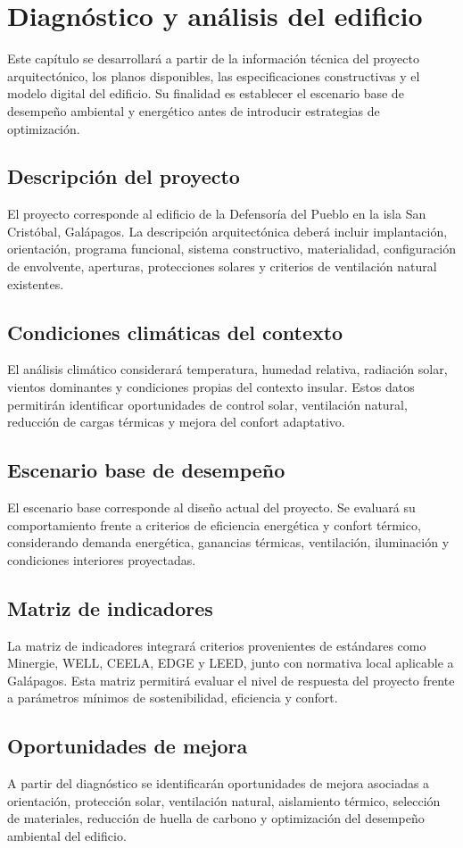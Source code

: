 \chapter{Diagnóstico y análisis del edificio}

Este capítulo se desarrollará a partir de la información técnica del proyecto arquitectónico, los planos disponibles, las especificaciones constructivas y el modelo digital del edificio. Su finalidad es establecer el escenario base de desempeño ambiental y energético antes de introducir estrategias de optimización.

\section{Descripción del proyecto}

El proyecto corresponde al edificio de la Defensoría del Pueblo en la isla San Cristóbal, Galápagos. La descripción arquitectónica deberá incluir implantación, orientación, programa funcional, sistema constructivo, materialidad, configuración de envolvente, aperturas, protecciones solares y criterios de ventilación natural existentes.

\section{Condiciones climáticas del contexto}

El análisis climático considerará temperatura, humedad relativa, radiación solar, vientos dominantes y condiciones propias del contexto insular. Estos datos permitirán identificar oportunidades de control solar, ventilación natural, reducción de cargas térmicas y mejora del confort adaptativo.

\section{Escenario base de desempeño}

El escenario base corresponde al diseño actual del proyecto. Se evaluará su comportamiento frente a criterios de eficiencia energética y confort térmico, considerando demanda energética, ganancias térmicas, ventilación, iluminación y condiciones interiores proyectadas.

\section{Matriz de indicadores}

La matriz de indicadores integrará criterios provenientes de estándares como Minergie, WELL, CEELA, EDGE y LEED, junto con normativa local aplicable a Galápagos. Esta matriz permitirá evaluar el nivel de respuesta del proyecto frente a parámetros mínimos de sostenibilidad, eficiencia y confort.

\section{Oportunidades de mejora}

A partir del diagnóstico se identificarán oportunidades de mejora asociadas a orientación, protección solar, ventilación natural, aislamiento térmico, selección de materiales, reducción de huella de carbono y optimización del desempeño ambiental del edificio.
